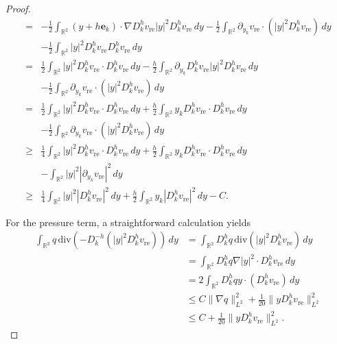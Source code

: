 \documentclass[12pt]{amsart}
\numberwithin{equation}{section}              %
\theoremstyle{remark}
\begin{document}
\begin{proof}
\begin{equation*}
\begin{aligned}
					= & - \frac{1}{2} \int_{\mathbb{R}^2} (y+h\mathbf{e}_k) \cdot \nabla D_k^h v_{\text{re}} |y|^2 D_k^h v_{\text{re}} \, dy - \frac{1}{2} \int_{\mathbb{R}^2} \partial_{y_k} v_{\text{re}} \cdot (|y|^2 D_k^h v_{\text{re}}) \, dy \\
					& - \frac{1}{2} \int_{\mathbb{R}^2} |y|^2 D_k^h v_{\text{re}} D_k^h v_{\text{re}} \, dy \\
					= & \frac{1}{2} \int_{\mathbb{R}^2} |y|^2 D_k^h v_{\text{re}} \cdot D_k^h v_{\text{re}} \, dy - \frac{h}{2} \int_{\mathbb{R}^2} \partial_{y_k}  D_k^h v_{\text{re}}  |y|^2 D_k^h v_{\text{re}} \, dy \\
					& - \frac{1}{2} \int_{\mathbb{R}^2} \partial_{y_k} v_{\text{re}} \cdot (|y|^2 D_k^h v_{\text{re}}) \, dy \\ 
					= & \frac{1}{2} \int_{\mathbb{R}^2} |y|^2 D_k^h v_{\text{re}} \cdot D_k^h v_{\text{re}} \, dy + \frac{h}{2} \int_{\mathbb{R}^2}y_k   D_k^h v_{\text{re}} \cdot  D_k^h v_{\text{re}} \, dy \\
					& - \frac{1}{2} \int_{\mathbb{R}^2} \partial_{y_k} v_{\text{re}} \cdot (|y|^2 D_k^h v_{\text{re}}) \, dy \\ 
                    \geq & \frac{1}{4} \int_{\mathbb{R}^2} |y|^2 D_k^h v_{\text{re}} \cdot D_k^h v_{\text{re}} \, dy + \frac{h}{2} \int_{\mathbb{R}^2}y_k   D_k^h v_{\text{re}} \cdot  D_k^h v_{\text{re}} \, dy \\
					& -  \int_{\mathbb{R}^2} |y|^2|\partial_{y_k} v_{\text{re}}|^2  \, dy \\ 
					\geq& \frac{1}{4} \int_{\mathbb{R}^2} |y|^2 |D_k^h v_{\text{re}}|^2  \, dy + \frac{h}{2} \int_{\mathbb{R}^2}y_k   |D_k^h v_{\text{re}}|^2   \, dy -C.
				\end{aligned}
			\end{equation*}			
			
			For the pressure term, a straightforward calculation yields
			\begin{equation*}
				\begin{aligned}
					\int_{\mathbb{R}^2} q \, \mathrm{div} (-D_k^{-h} (|y|^2 D_k^h v_{\text{re}})) \, dy 
					&= \int_{\mathbb{R}^2} D_k^h q \, \mathrm{div} (|y|^2 D_k^h v_{\text{re}}) \, dy \\
					&= \int_{\mathbb{R}^2} D_k^h q \nabla |y|^2 \cdot D_k^h v_{\text{re}} \, dy \\
					&= 2 \int_{\mathbb{R}^2} D_k^h q y \cdot (D_k^h v_{\text{re}}) \, dy \\
					&\leq C\|\nabla q\|_{L^2}^2 + \frac{1}{20}\|yD_k^h v_{\text{re}}\|_{L^2}^2\\
                    &\leq C + \frac{1}{20}\|yD_k^h v_{\text{re}}\|_{L^2}^2.
				\end{aligned}
			\end{equation*}
			

\end{proof}
\end{document}
